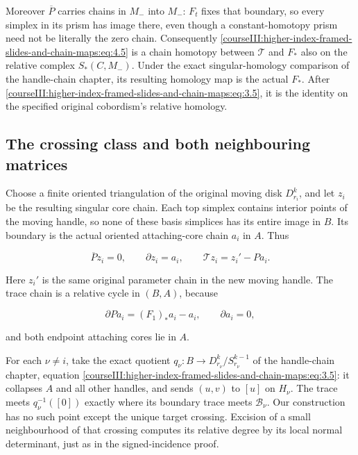 Moreover \(\overline P\) carries chains in \(M_-\) into \(M_-\): \(F_t\) fixes that boundary, so every simplex in its prism has image there, even though a constant-homotopy prism need not be literally the zero chain. Consequently \eqref{courseIII:higher-index-framed-slides-and-chain-maps:eq:4.5} is a chain homotopy between \(\mathcal T\) and \(F_*\) also on the relative complex \(S_*(C,M_-)\). Under the exact singular-homology comparison of the handle-chain chapter, its resulting homology map is the actual \(F_*\). After \eqref{courseIII:higher-index-framed-slides-and-chain-maps:eq:3.5}, it is the identity on the specified original cobordism's relative homology.

\subsection{The crossing class and both neighbouring matrices}
\label{courseIII:higher-index-framed-slides-and-chain-maps:higher-slide-matrices}

\label{courseIII:higher-index-framed-slides-and-chain-maps:section-5}\label{courseIII:higher-slides:5}

Choose a finite oriented triangulation of the original moving disk \(D^k_{r_i}\), and let \(z_i\) be the resulting singular core chain. Each top simplex contains interior points of the moving handle, so none of these basis simplices has its entire image in \(B\). Its boundary is the actual oriented attaching-core chain \(a_i\) in \(A\). Thus

\begin{equation}
\overline P z_i=0,\qquad
 \partial z_i=a_i,\qquad
 \mathcal T z_i=z_i'-P a_i.
 \label{courseIII:higher-index-framed-slides-and-chain-maps:eq:5.1}
\end{equation}

Here \(z_i'\) is the same original parameter chain in the new moving handle. The trace chain is a relative cycle in \((B,A)\), because

\begin{equation}
\partial P a_i=(F_1)_*a_i-a_i,\qquad
 \partial a_i=0,
 \label{courseIII:higher-index-framed-slides-and-chain-maps:eq:5.2}
\end{equation}

and both endpoint attaching cores lie in \(A\).

For each \(\nu\ne i\), take the exact quotient \(q_\nu:B\to D^k_{r_\nu}/S^{k-1}_{r_\nu}\) of the handle-chain chapter, equation \eqref{courseIII:higher-index-framed-slides-and-chain-maps:eq:3.5}: it collapses \(A\) and all other handles, and sends \((u,v)\) to \([u]\) on \(H_\nu\). The trace meets \(q_\nu^{-1}([0])\) exactly where its boundary trace meets \(\mathcal B_\nu\). Our construction has no such point except the unique target crossing. Excision of a small neighbourhood of that crossing computes its relative degree by its local normal determinant, just as in the signed-incidence proof.

